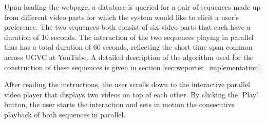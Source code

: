 Upon loading the webpage, a database is queried for a pair of sequences made up from different video parts for which the system would like to elicit a user's preference. The two sequences both consist of six video parts that each have a duration of 10 seconds. The interaction of the two sequences playing in parallel thus has a total duration of 60 seconds, reflecting the short time span common across UGVC at YouTube\cite{Cha:2007ty, Cheng:2007tc}. A detailed description of the algorithm used for the construction of these sequences is given in section \ref{sec:weporter_implementation}.

After reading the instructions, the user scrolls down to the interactive parallel video player that displays two videos on top of each other. By clicking the `Play' button, the user starts the interaction and sets in motion the consecutive playback of both sequences in parallel.

